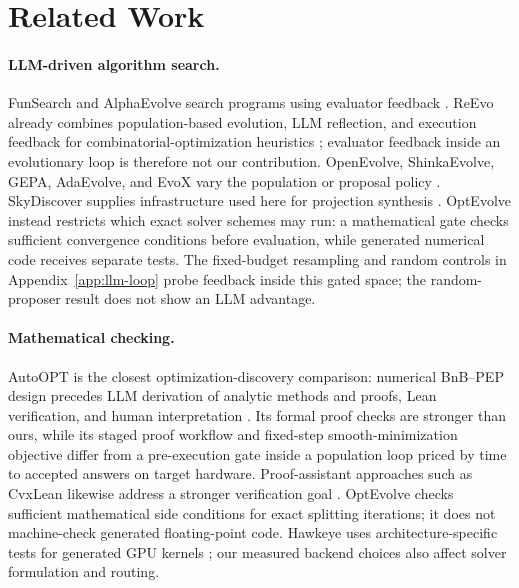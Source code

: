 \section{Related Work}

\paragraph{LLM-driven algorithm search.}
FunSearch and AlphaEvolve search programs using evaluator feedback \citep{RomeraParedes2023Mathematical,Novikov2025AlphaEvolve}. ReEvo already combines population-based evolution, LLM reflection, and execution feedback for combinatorial-optimization heuristics \citep{ye2024reevo}; evaluator feedback inside an evolutionary loop is therefore not our contribution. OpenEvolve, ShinkaEvolve, GEPA, AdaEvolve, and EvoX vary the population or proposal policy \citep{Sharma2025OpenEvolve,Lange2025ShinkaEvolve,Agrawal2025GEPA,Cemri2026AdaEvolve,Liu2026EvoX}. SkyDiscover supplies infrastructure used here for projection synthesis \citep{Liu2026SkyDiscover}. OptEvolve instead restricts which exact solver schemes may run: a mathematical gate checks sufficient convergence conditions before evaluation, while generated numerical code receives separate tests. The fixed-budget resampling and random controls in Appendix~\ref{app:llm-loop} probe feedback inside this gated space; the random-proposer result does not show an LLM advantage.

\paragraph{Mathematical checking.}
AutoOPT is the closest optimization-discovery comparison: numerical BnB--PEP design precedes LLM derivation of analytic methods and proofs, Lean verification, and human interpretation \citep{Kim2026AutoOPT}. Its formal proof checks are stronger than ours, while its staged proof workflow and fixed-step smooth-minimization objective differ from a pre-execution gate inside a population loop priced by time to accepted answers on target hardware. Proof-assistant approaches such as CvxLean likewise address a stronger verification goal \citep{Bentkamp2023VerifiedReductions,Brugger2025Toward}. OptEvolve checks sufficient mathematical side conditions for exact splitting iterations; it does not machine-check generated floating-point code. Hawkeye uses architecture-specific tests for generated GPU kernels \citep{Hawkeye2026}; our measured backend choices also affect solver formulation and routing.

